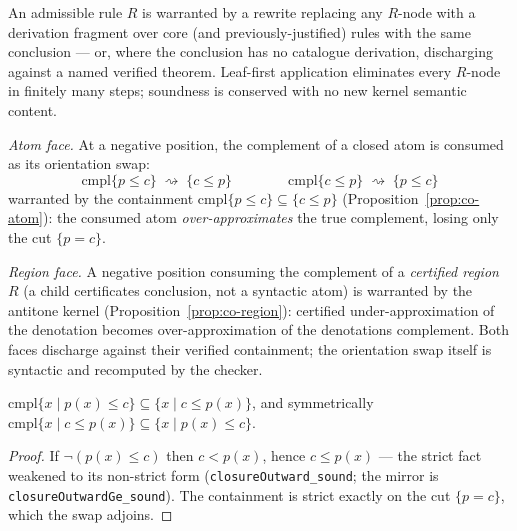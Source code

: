 

\begin{brecipe}\label{rec:co-template}
An admissible rule $R$ is warranted by a rewrite replacing any
$R$-node with a derivation fragment over core (and
previously-justified) rules with the same conclusion --- or, where the
conclusion has no catalogue derivation, discharging against a named
verified theorem. Leaf-first application eliminates every $R$-node in
finitely many steps; soundness is conserved with no new kernel
semantic content.
\end{brecipe}

\begin{brecipe}
\label{rec:co-instance}
\emph{Atom face.} At a negative position, the complement of a closed
atom is consumed as its orientation swap:
\[
\mathrm{cmpl}\{p \le c\} \;\rightsquigarrow\; \{c \le p\}
\qquad\qquad
\mathrm{cmpl}\{c \le p\} \;\rightsquigarrow\; \{p \le c\}
\]
warranted by the containment
$\mathrm{cmpl}\{p \le c\} \subseteq \{c \le p\}$
(Proposition~\ref{prop:co-atom}): the consumed atom
\emph{over-approximates} the true complement, losing only the cut
$\{p = c\}$.

\emph{Region face.} A negative position consuming the complement of a
\emph{certified region} $R$ (a child certificate\textquotesingle s
conclusion, not a syntactic atom) is warranted by the antitone kernel
(Proposition~\ref{prop:co-region}): certified under-approximation of
the denotation becomes over-approximation of the
denotation\textquotesingle s complement. Both faces discharge against
their verified containment; the orientation swap itself is syntactic
and recomputed by the checker.
\end{brecipe}

\begin{bprop}\label{prop:co-atom}
$\mathrm{cmpl}\{x \mid p(x) \le c\} \subseteq \{x \mid c \le p(x)\}$,
and symmetrically
$\mathrm{cmpl}\{x \mid c \le p(x)\} \subseteq \{x \mid p(x) \le c\}$.
\end{bprop}
\begin{proof}
If $\neg(p(x) \le c)$ then $c < p(x)$, hence $c \le p(x)$ --- the
strict fact weakened to its non-strict form
(\texttt{closureOutward\_sound}; the mirror is
\texttt{closureOutwardGe\_sound}). The containment is strict exactly
on the cut $\{p = c\}$, which the swap adjoins.
\end{proof}

